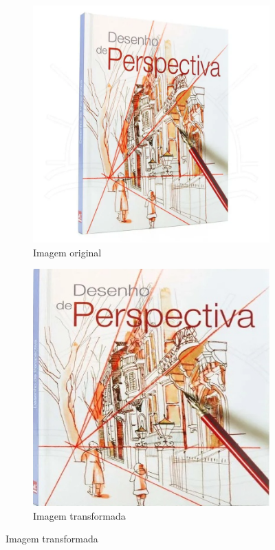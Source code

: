 \documentclass[sigconf,nonacm]{acmart}
\begin{document}
\begin{figure}[H]
  \centering
  \begin{subfigure}[b]{0.45\linewidth}
    \centering
    \includegraphics[width=\linewidth]{../resources/input1.jpg}
    \caption{Imagem original}
    \label{fig:one}
  \end{subfigure}
  \hfill
  \begin{subfigure}[b]{0.45\linewidth}
    \centering
    \includegraphics[width=\linewidth]{../resources/output1.jpg}
    \caption{Imagem transformada}
    \label{fig:two}
  \end{subfigure}


\end{figure}
\end{document}
